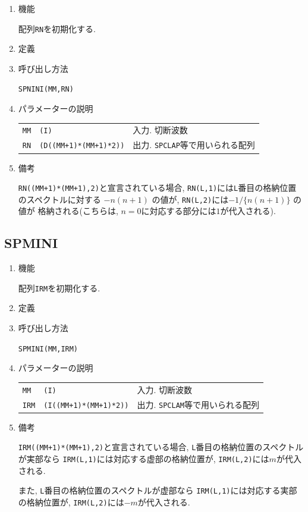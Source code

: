 \documentclass[a4j,fleqn]{jarticle}
\begin{document}
\begin{enumerate}

\item 機能

 配列{\tt RN}を初期化する.

\item 定義

\item 呼び出し方法 

{\tt SPNINI(MM,RN)}

\item パラメーターの説明

\begin{tabular}{lll}
{\tt MM} & {\tt (I)} & 入力. 切断波数\\
{\tt RN}  & {\tt (D((MM+1)*(MM+1)*2))}
             & 出力. {\tt SPCLAP}等で用いられる配列
\end{tabular}

\item 備考

{\tt RN((MM+1)*(MM+1),2)}と宣言されている場合,
{\tt RN(L,1)}には{\tt L}番目の格納位置のスペクトルに対する 
$-n(n+1)$ の値が, {\tt RN(L,2)}には$-1/\{n(n+1)\}$ の値が
格納される(こちらは, $n=0$に対応する部分には$1$が代入される).

\end{enumerate}

\subsection{SPMINI}

\begin{enumerate}

\item 機能

 配列{\tt IRM}を初期化する.

\item 定義

\item 呼び出し方法 

{\tt SPMINI(MM,IRM)}

\item パラメーターの説明

\begin{tabular}{lll}
{\tt MM} & {\tt (I)} & 入力. 切断波数\\
{\tt IRM}  & {\tt (I((MM+1)*(MM+1)*2))}
             & 出力. {\tt SPCLAM}等で用いられる配列
\end{tabular}

\item 備考

{\tt IRM((MM+1)*(MM+1),2)}と宣言されている場合,
{\tt L}番目の格納位置のスペクトルが実部なら
{\tt IRM(L,1)}には対応する虚部の格納位置が,
{\tt IRM(L,2)}には$m$が代入される.

また,
{\tt L}番目の格納位置のスペクトルが虚部なら
{\tt IRM(L,1)}には対応する実部の格納位置が,
{\tt IRM(L,2)}には$-m$が代入される.

\end{enumerate}
\end{document}
